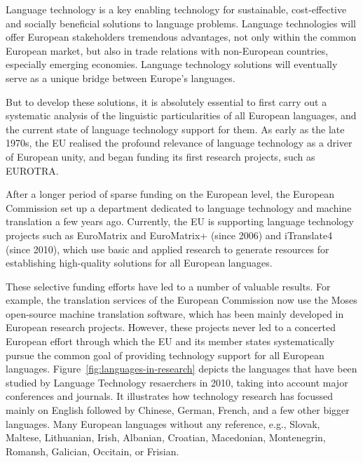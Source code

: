 \documentclass[10pt, plain]{../../metanetpaper}
\begin{document}
\begin{multicols}{2}
Language technology is a key enabling technology for sustainable, cost-effective and socially beneficial solutions to language problems. Language technologies will offer European stakeholders tremendous advantages, not only within the common European market, but also in trade relations with non-European countries, especially emerging economies. Language technology solutions will eventually serve as a unique bridge between Europe's languages.

But to develop these solutions, it is absolutely essential to first carry out a systematic analysis of the linguistic particularities of all European languages, and the current state of language technology support for them. As early as the late 1970s, the EU realised the profound relevance of language technology as a driver of European unity, and began funding its first research projects, such as EUROTRA.

After a longer period of sparse funding on the European level, the European Commission set up a department dedicated to language technology and machine translation a few years ago. Currently, the EU is supporting language technology projects such as EuroMatrix and EuroMatrix+ (since 2006) and iTranslate4 (since 2010), which use basic and applied research to generate resources for establishing high-quality solutions for all European languages.

These selective funding efforts have led to a number of valuable results. For example, the translation services of the European Commission now use the Moses open-source machine translation software, which has been mainly developed in European research projects. However, these projects never led to a concerted European effort through which the EU and its member states systematically pursue the common goal of providing technology support for all European languages. Figure~\ref{fig:languages-in-research} depicts the languages that have been studied by Language Technology resaerchers in 2010, taking into account major conferences and journals. It illustrates how technology research has focussed mainly on English followed by Chinese, German, French, and a few other bigger languages. Many European languages without any reference, e.g., Slovak, Maltese, Lithuanian, Irish, Albanian, Croatian, Macedonian, Montenegrin, Romansh, Galician, Occitain, or Frisian.


\end{multicols}
\end{document}
